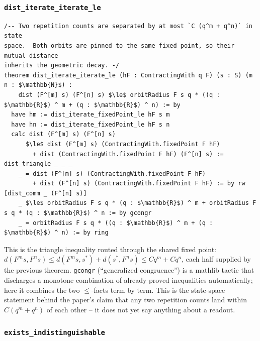 \documentclass[11pt]{article}
\begin{document}
\subsubsection*{\texttt{dist\_iterate\_iterate\_le}}

\begin{lstlisting}
/-- Two repetition counts are separated by at most `C (q^m + q^n)` in state
space.  Both orbits are pinned to the same fixed point, so their mutual distance
inherits the geometric decay. -/
theorem dist_iterate_iterate_le (hF : ContractingWith q F) (s : S) (m n : $\mathbb{N}$) :
    dist (F^[m] s) (F^[n] s) $\le$ orbitRadius F s q * ((q : $\mathbb{R}$) ^ m + (q : $\mathbb{R}$) ^ n) := by
  have hm := dist_iterate_fixedPoint_le hF s m
  have hn := dist_iterate_fixedPoint_le hF s n
  calc dist (F^[m] s) (F^[n] s)
      $\le$ dist (F^[m] s) (ContractingWith.fixedPoint F hF)
        + dist (ContractingWith.fixedPoint F hF) (F^[n] s) := dist_triangle _ _ _
    _ = dist (F^[m] s) (ContractingWith.fixedPoint F hF)
        + dist (F^[n] s) (ContractingWith.fixedPoint F hF) := by rw [dist_comm _ (F^[n] s)]
    _ $\le$ orbitRadius F s q * (q : $\mathbb{R}$) ^ m + orbitRadius F s q * (q : $\mathbb{R}$) ^ n := by gcongr
    _ = orbitRadius F s q * ((q : $\mathbb{R}$) ^ m + (q : $\mathbb{R}$) ^ n) := by ring
\end{lstlisting}

This is the triangle inequality routed through the shared fixed point:
$d(F^m s, F^n s) \le d(F^m s, s^\ast) + d(s^\ast, F^n s) \le Cq^m + Cq^n$, each
half supplied by the previous theorem. \texttt{gcongr} (``generalized
congruence'') is a mathlib tactic that discharges a monotone combination of
already-proved inequalities automatically; here it combines the two
$\le$-facts term by term. This is the state-space statement behind the paper's
claim that any two repetition counts land within $C(q^m+q^n)$ of each other --
it does not yet say anything about a readout.

\subsubsection*{\texttt{exists\_indistinguishable}}
\end{document}
